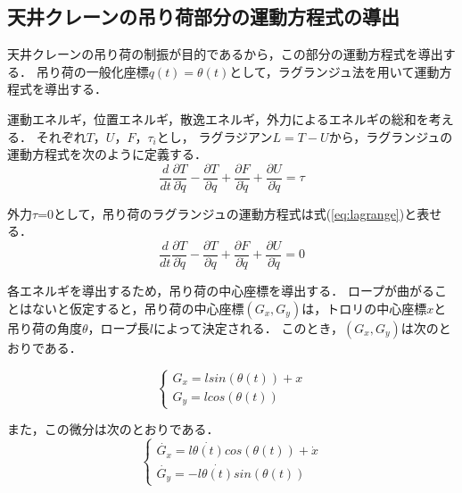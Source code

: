 \documentclass[dvipdfmx,titlepage,a4j]{jsarticle}  %
\begin{document}
\subsection{天井クレーンの吊り荷部分の運動方程式の導出}
天井クレーンの吊り荷の制振が目的であるから，この部分の運動方程式を導出する．
吊り荷の一般化座標$q(t) = \theta(t)$として，ラグランジュ法を用いて運動方程式を導出する．

運動エネルギ，位置エネルギ，散逸エネルギ，外力によるエネルギの総和を考える．
それぞれ$T$，$U$，$F$，$\tau_i$とし，
ラグラジアン$L = T - U$から，ラグランジュの運動方程式を次のように定義する．
\begin{equation}
  \frac{d}{dt} \frac{\partial T}{\partial \dot{q}} - \frac{\partial T}{\partial q} + \frac{\partial F}{\partial \dot q} + \frac{\partial U}{\partial \dot q} = \tau \nonumber
\end{equation}

外力$\tau$=0として，吊り荷のラグランジュの運動方程式は式(\ref{eq:lagrange})と表せる．
\begin{equation}
  \frac{d}{dt} \frac{\partial T}{\partial \dot{q}} - \frac{\partial T}{\partial q} + \frac{\partial F}{\partial \dot q} + \frac{\partial U}{\partial \dot q} = 0 \label{eq:lagrange}
\end{equation}

各エネルギを導出するため，吊り荷の中心座標を導出する．
ロープが曲がることはないと仮定すると，吊り荷の中心座標$(G_x, G_y)$は，トロリの中心座標$x$と吊り荷の角度$\theta$，ロープ長$l$によって決定される．
このとき，$(G_x, G_y)$は次のとおりである．

\begin{equation}
  \begin{cases}
    G_x = l sin(\theta(t)) + x \nonumber \\
    G_y = l cos(\theta(t))
  \end{cases}
\end{equation}

また，この微分は次のとおりである．
\begin{equation}
  \begin{cases}
    \dot{G_x} = l \dot{\theta(t)} cos(\theta(t)) + \dot x \nonumber \\
    \dot{G_y} = -l \dot{\theta(t)} sin(\theta(t))
  \end{cases}
\end{equation}
\end{document}
